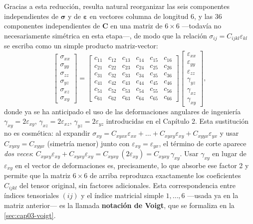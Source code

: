 Gracias a esta reducción, resulta natural reorganizar las seis componentes independientes de $\bm\sigma$ y de $\bm\varepsilon$ en vectores columna de longitud 6, y las 36 componentes independientes de $\bm C$ en una matriz de $6\times 6$ —todavía no necesariamente simétrica en esta etapa—, de modo que la relación $\sigma_{ij}=C_{ijkl}\varepsilon_{kl}$ se escriba como un simple producto matriz-vector:
\[
\begin{bmatrix} \sigma_{xx} \\ \sigma_{yy} \\ \sigma_{zz} \\ \sigma_{yz} \\ \sigma_{xz} \\ \sigma_{xy} \end{bmatrix}
=
\begin{bmatrix}
c_{11} & c_{12} & c_{13} & c_{14} & c_{15} & c_{16} \\
c_{21} & c_{22} & c_{23} & c_{24} & c_{25} & c_{26} \\
c_{31} & c_{32} & c_{33} & c_{34} & c_{35} & c_{36} \\
c_{41} & c_{42} & c_{43} & c_{44} & c_{45} & c_{46} \\
c_{51} & c_{52} & c_{53} & c_{54} & c_{55} & c_{56} \\
c_{61} & c_{62} & c_{63} & c_{64} & c_{65} & c_{66}
\end{bmatrix}
\begin{bmatrix} \varepsilon_{xx} \\ \varepsilon_{yy} \\ \varepsilon_{zz} \\ \gamma_{yz} \\ \gamma_{xz} \\ \gamma_{xy} \end{bmatrix},
\]
donde ya se ha anticipado el uso de las deformaciones angulares de ingeniería $\gamma_{xy}=2\varepsilon_{xy}$, $\gamma_{xz}=2\varepsilon_{xz}$, $\gamma_{yz}=2\varepsilon_{yz}$ introducidas en el Capítulo 2. Esta sustitución no es cosmética: al expandir $\sigma_{xy}=C_{xyxx}\varepsilon_{xx}+\dots+C_{xyxy}\varepsilon_{xy}+C_{xyyx}\varepsilon_{yx}$ y usar $C_{xyxy}=C_{xyyx}$ (simetría menor) junto con $\varepsilon_{xy}=\varepsilon_{yx}$, el término de corte aparece \emph{dos veces}: $C_{xyxy}\varepsilon_{xy}+C_{xyxy}\varepsilon_{xy}=C_{xyxy}\,(2\varepsilon_{xy})=C_{xyxy}\,\gamma_{xy}$. Usar $\gamma_{xy}$ en lugar de $\varepsilon_{xy}$ en el vector de deformaciones es, precisamente, lo que absorbe ese factor 2 y permite que la matriz $6\times 6$ de arriba reproduzca exactamente los coeficientes $C_{ijkl}$ del tensor original, sin factores adicionales. Esta correspondencia entre índices tensoriales $(ij)$ y el índice matricial simple $1,\dots,6$ —usada ya en la matriz anterior— es la llamada \textbf{notación de Voigt}, que se formaliza en la \cref{sec:cap03-voigt}.

